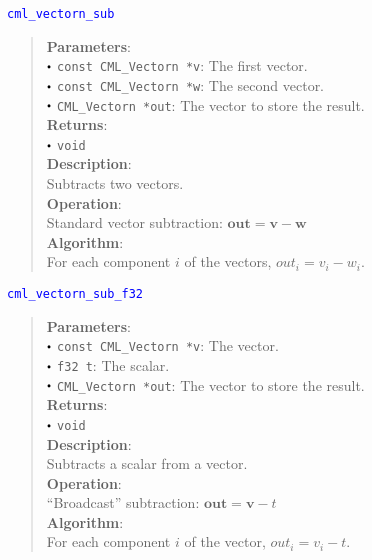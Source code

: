 \documentclass[a4paper,oneside,8pt]{extarticle}
\newcommand{\function}[1]{
  \noindent\textcolor{blue}{\texttt{#1}}
  \vspace{-0.3em}
}
\renewcommand{\dot}{\raisebox{0.3ex}{\scalebox{0.6}{$\bullet$}}}
\theoremstyle{definition}
\begin{document}
\function{cml\_vectorn\_sub}
\begin{quote}
  \textbf{Parameters}: \\
  $\dot$ \texttt{const CML\_Vectorn *v}: The first vector. \\
  $\dot$ \texttt{const CML\_Vectorn *w}: The second vector. \\
  $\dot$ \texttt{CML\_Vectorn *out}: The vector to store the result. \\
  \textbf{Returns}: \\
  $\dot$ \texttt{void} \\

  \vspace{-0.75em}
  \textbf{Description}: \\
  Subtracts two vectors. \\

  \vspace{-0.75em}
  \textbf{Operation}: \\
  Standard vector subtraction: $\mathbf{out} = \mathbf{v} - \mathbf{w}$ \\

  \vspace{-0.75em}
  \textbf{Algorithm}: \\
  For each component $i$ of the vectors, $out_i = v_i - w_i$. \\
\end{quote}

\function{cml\_vectorn\_sub\_f32}
\begin{quote}
  \textbf{Parameters}: \\
  $\dot$ \texttt{const CML\_Vectorn *v}: The vector. \\
  $\dot$ \texttt{f32 t}: The scalar. \\
  $\dot$ \texttt{CML\_Vectorn *out}: The vector to store the result. \\
  \textbf{Returns}: \\
  $\dot$ \texttt{void} \\

  \vspace{-0.75em}
  \textbf{Description}: \\
  Subtracts a scalar from a vector. \\

  \vspace{-0.75em}
  \textbf{Operation}: \\
  ``Broadcast'' subtraction: $\mathbf{out} = \mathbf{v} - t$ \\

  \vspace{-0.75em}
  \textbf{Algorithm}: \\
  For each component $i$ of the vector, $out_i = v_i - t$. \\
\end{quote}
\end{document}

